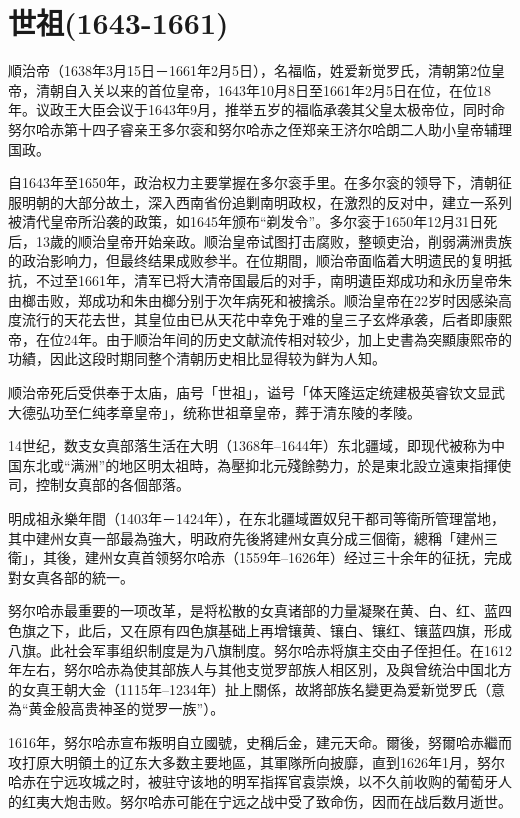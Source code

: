 
\section{世祖\tiny(1643-1661)}

順治帝（1638年3月15日－1661年2月5日），名福临，姓爱新觉罗氏，清朝第2位皇帝，清朝自入关以来的首位皇帝，1643年10月8日至1661年2月5日在位，在位18年。议政王大臣会议于1643年9月，推举五岁的福临承袭其父皇太极帝位，同时命努尔哈赤第十四子睿亲王多尔衮和努尔哈赤之侄郑亲王济尔哈朗二人助小皇帝辅理国政。

自1643年至1650年，政治权力主要掌握在多尔衮手里。在多尔衮的领导下，清朝征服明朝的大部分故土，深入西南省份追剿南明政权，在激烈的反对中，建立一系列被清代皇帝所沿袭的政策，如1645年颁布“剃发令”。多尔衮于1650年12月31日死后，13歲的顺治皇帝开始亲政。顺治皇帝试图打击腐败，整顿吏治，削弱满洲贵族的政治影响力，但最终结果成败参半。在位期間，顺治帝面临着大明遗民的复明抵抗，不过至1661年，清军已将大清帝国最后的对手，南明遺臣郑成功和永历皇帝朱由榔击败，郑成功和朱由榔分别于次年病死和被擒杀。顺治皇帝在22岁时因感染高度流行的天花去世，其皇位由已从天花中幸免于难的皇三子玄烨承袭，后者即康熙帝，在位24年。由于顺治年间的历史文献流传相对较少，加上史書為突顯康熙帝的功績，因此这段时期同整个清朝历史相比显得较为鲜为人知。

顺治帝死后受供奉于太庙，庙号「世祖」，谥号「体天隆运定统建极英睿钦文显武大德弘功至仁纯孝章皇帝」，统称世祖章皇帝，葬于清东陵的孝陵。


14世纪，数支女真部落生活在大明（1368年–1644年）东北疆域，即现代被称为中国东北或“满洲”的地区明太祖時，為壓抑北元殘餘勢力，於是東北設立遠東指揮使司，控制女真部的各個部落。

明成祖永樂年間（1403年－1424年），在东北疆域置奴兒干都司等衛所管理當地，其中建州女真一部最為強大，明政府先後將建州女真分成三個衛，總稱「建州三衛」，其後，建州女真首领努尔哈赤（1559年–1626年）经过三十余年的征抚，完成對女真各部的統一。

努尔哈赤最重要的一项改革，是将松散的女真诸部的力量凝聚在黄、白、红、蓝四色旗之下，此后，又在原有四色旗基础上再增镶黄、镶白、镶红、镶蓝四旗，形成八旗。此社会军事组织制度是为八旗制度。努尔哈赤将旗主交由子侄担任。在1612年左右，努尔哈赤為使其部族人与其他支觉罗部族人相区別，及與曾统治中国北方的女真王朝大金（1115年–1234年）扯上關係，故將部族名變更為爱新觉罗氏（意為“黄金般高贵神圣的觉罗一族”）。

1616年，努尔哈赤宣布叛明自立國號，史稱后金，建元天命。爾後，努爾哈赤繼而攻打原大明領土的辽东大多数主要地區，其軍隊所向披靡，直到1626年1月，努尔哈赤在宁远攻城之时，被驻守该地的明军指挥官袁崇焕，以不久前收购的葡萄牙人的红夷大炮击败。努尔哈赤可能在宁远之战中受了致命伤，因而在战后数月逝世。

